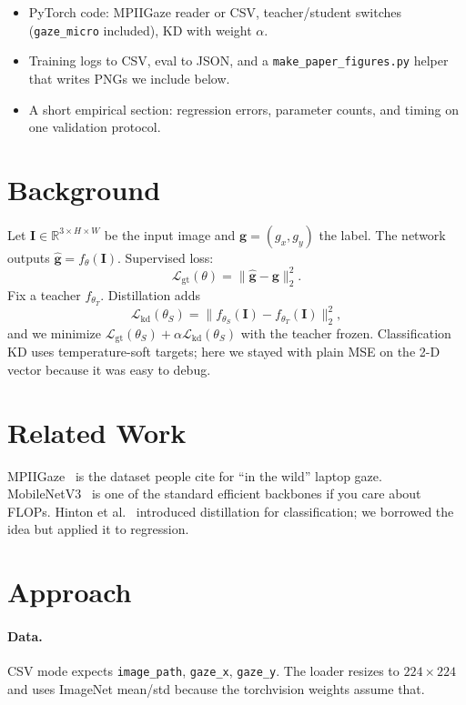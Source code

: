 \documentclass[10pt, reqno, letterpaper, twoside]{amsart}
\begin{document}
\begin{itemize}
  \item PyTorch code: MPIIGaze reader or CSV, teacher/student switches (\texttt{gaze\_micro} included), KD with weight $\alpha$.
  \item Training logs to CSV, eval to JSON, and a \texttt{make\_paper\_figures.py} helper that writes PNGs we include below.
  \item A short empirical section: regression errors, parameter counts, and timing on one validation protocol.
\end{itemize}

\section{Background}

Let $\mathbf{I} \in \mathbb{R}^{3\times H \times W}$ be the input image and $\mathbf{g} = (g_x, g_y)$ the label. The network outputs $\hat{\mathbf{g}} = f_\theta(\mathbf{I})$. Supervised loss:
\[
  \mathcal{L}_{\mathrm{gt}}(\theta) = \big\lVert \hat{\mathbf{g}} - \mathbf{g} \big\rVert_2^2 .
\]
Fix a teacher $f_{\theta_T}$. Distillation adds
\[
  \mathcal{L}_{\mathrm{kd}}(\theta_S) = \big\lVert f_{\theta_S}(\mathbf{I}) - f_{\theta_T}(\mathbf{I}) \big\rVert_2^2 ,
\]
and we minimize $\mathcal{L}_{\mathrm{gt}}(\theta_S) + \alpha \mathcal{L}_{\mathrm{kd}}(\theta_S)$ with the teacher frozen. Classification KD uses temperature-soft targets; here we stayed with plain MSE on the 2-D vector because it was easy to debug.

\section{Related Work}

MPIIGaze~\cite{zhang15mpiigaze} is the dataset people cite for ``in the wild'' laptop gaze. MobileNetV3~\cite{howard19mobilenetv3} is one of the standard efficient backbones if you care about FLOPs. Hinton et al.~\cite{hinton15kd} introduced distillation for classification; we borrowed the idea but applied it to regression.

\section{Approach}

\paragraph{Data.} CSV mode expects \texttt{image\_path}, \texttt{gaze\_x}, \texttt{gaze\_y}. The loader resizes to $224\times224$ and uses ImageNet mean/std because the torchvision weights assume that.
\end{document}
